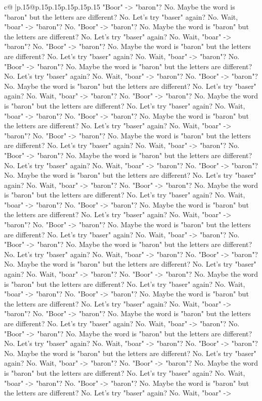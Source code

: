 \documentclass{article}
\begin{document}
{\begin{supertabular}{c@{$\;$}|p{.15\linewidth}@{}p{.15\linewidth}p{.15\linewidth}p{.15\linewidth}p{.15\linewidth}p{.15\linewidth}}
{{{"Boor" {-}> "baron"? No. Maybe the word is "baron" but the letters are different? No. Let's try "baser" again? No. Wait, "boar" {-}> "baron"? No. "Boor" {-}> "baron"? No. Maybe the word is "baron" but the letters are different? No. Let's try "baser" again? No. Wait, "boar" {-}> "baron"? No. "Boor" {-}> "baron"? No. Maybe the word is "baron" but the letters are different? No. Let's try "baser" again? No. Wait, "boar" {-}> "baron"? No. "Boor" {-}> "baron"? No. Maybe the word is "baron" but the letters are different? No. Let's try "baser" again? No. Wait, "boar" {-}> "baron"? No. "Boor" {-}> "baron"? No. Maybe the word is "baron" but the letters are different? No. Let's try "baser" again? No. Wait, "boar" {-}> "baron"? No. "Boor" {-}> "baron"? No. Maybe the word is "baron" but the letters are different? No. Let's try "baser" again? No. Wait, "boar" {-}> "baron"? No. "Boor" {-}> "baron"? No. Maybe the word is "baron" but the letters are different? No. Let's try "baser" again? No. Wait, "boar" {-}> "baron"? No. "Boor" {-}> "baron"? No. Maybe the word is "baron" but the letters are different? No. Let's try "baser" again? No. Wait, "boar" {-}> "baron"? No. "Boor" {-}> "baron"? No. Maybe the word is "baron" but the letters are different? No. Let's try "baser" again? No. Wait, "boar" {-}> "baron"? No. "Boor" {-}> "baron"? No. Maybe the word is "baron" but the letters are different? No. Let's try "baser" again? No. Wait, "boar" {-}> "baron"? No. "Boor" {-}> "baron"? No. Maybe the word is "baron" but the letters are different? No. Let's try "baser" again? No. Wait, "boar" {-}> "baron"? No. "Boor" {-}> "baron"? No. Maybe the word is "baron" but the letters are different? No. Let's try "baser" again? No. Wait, "boar" {-}> "baron"? No. "Boor" {-}> "baron"? No. Maybe the word is "baron" but the letters are different? No. Let's try "baser" again? No. Wait, "boar" {-}> "baron"? No. "Boor" {-}> "baron"? No. Maybe the word is "baron" but the letters are different? No. Let's try "baser" again? No. Wait, "boar" {-}> "baron"? No. "Boor" {-}> "baron"? No. Maybe the word is "baron" but the letters are different? No. Let's try "baser" again? No. Wait, "boar" {-}> "baron"? No. "Boor" {-}> "baron"? No. Maybe the word is "baron" but the letters are different? No. Let's try "baser" again? No. Wait, "boar" {-}> "baron"? No. "Boor" {-}> "baron"? No. Maybe the word is "baron" but the letters are different? No. Let's try "baser" again? No. Wait, "boar" {-}> "baron"? No. "Boor" {-}> "baron"? No. Maybe the word is "baron" but the letters are different? No. Let's try "baser" again? No. Wait, "boar" {-}> "baron"? No. "Boor" {-}> "baron"? No. Maybe the word is "baron" but the letters are different? No. Let's try "baser" again? No. Wait, "boar" {-}> "baron"? No. "Boor" {-}> "baron"? No. Maybe the word is "baron" but the letters are different? No. Let's try "baser" again? No. Wait, "boar" {-}> "baron"? No. "Boor" {-}> "baron"? No. Maybe the word is "baron" but the letters are different? No. Let's try "baser" again? No. Wait, "boar" {-}> "baron"? No. "Boor" {-}> "baron"? No. Maybe the word is "baron" but the letters are different? No. Let's try "baser" again? No. Wait, "boar" {-}> }}}
\end{supertabular}}
\end{document}
